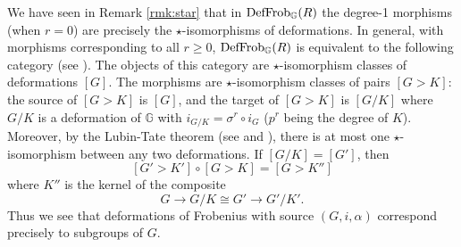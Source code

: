 \documentclass{gtpart}
\theoremstyle{definition}
\theoremstyle{remark}
\newcommand{\mb}[1]{\mathbb{#1}}
\newcommand{\DF}{{{\rm DefFrob}_\BG}}
\newcommand{\BG}{{\mb G}}
\newcommand{\A}{\alpha}
\numberwithin{equation}{section}
\numberwithin{thm}{section}
\begin{document}
We have seen in Remark \ref{rmk:star} that in $\DF(R)$ the degree-1 
morphisms (when $r = 0$) are precisely the $\star$-isomorphisms of 
deformations.  In general, with morphisms corresponding to all 
$r \geq 0$, $\DF(R)$ is equivalent to the following category (see 
\cite[Proposition 16.9]{lpo}).  The objects of this category are 
$\star$-isomorphism classes of deformations $[G]$.  The morphisms are 
$\star$-isomorphism classes of pairs $[G>K]$: the source of $[G>K]$ is 
$[G]$, and the target of $[G>K]$ is $[G/K]$ where $G/K$ is a deformation 
of $\BG$ with $i_{G/K} = \sigma^r \circ i_G$ ($p^r$ being the degree of 
$K$).  Moreover, by the Lubin-Tate theorem (see 
\cite[Theorem 3.1]{lubintate} and \cite[Section 4.3]{Rnotes}), there is 
at most one $\star$-isomorphism between any two deformations.  If 
$[G/K] = [G']$, then 
\[
 [G'>K'] \circ [G>K] = [G>K''] 
\]
where $K''$ is the kernel of the composite 
\[
 G \to G/K \cong G' \to G'/K'.  
\]
Thus we see that deformations of Frobenius with source $(G,i,\A)$ 
correspond precisely to subgroups of $G$.  
\end{document}
